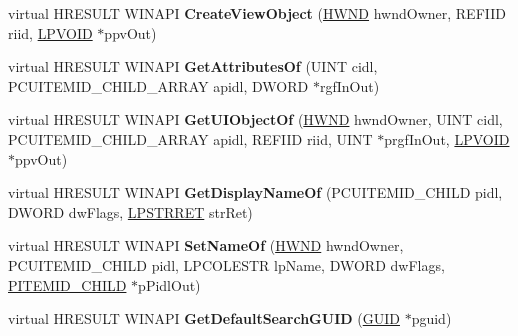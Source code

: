 \begin{DoxyCompactItemize}
virtual H\+R\+E\+S\+U\+LT W\+I\+N\+A\+PI {\bfseries Create\+View\+Object} (\hyperlink{interfacevoid}{H\+W\+ND} hwnd\+Owner, R\+E\+F\+I\+ID riid, \hyperlink{interfacevoid}{L\+P\+V\+O\+ID} $\ast$ppv\+Out)
\item 
\mbox{\label{class_c_control_panel_folder_a7e164af7fec38cb12ba2a0cb64ab7d10}} 
virtual H\+R\+E\+S\+U\+LT W\+I\+N\+A\+PI {\bfseries Get\+Attributes\+Of} (U\+I\+NT cidl, P\+C\+U\+I\+T\+E\+M\+I\+D\+\_\+\+C\+H\+I\+L\+D\+\_\+\+A\+R\+R\+AY apidl, D\+W\+O\+RD $\ast$rgf\+In\+Out)
\item 
\mbox{\label{class_c_control_panel_folder_aff33fd4a0aa911ca1845019c0f487ea9}} 
virtual H\+R\+E\+S\+U\+LT W\+I\+N\+A\+PI {\bfseries Get\+U\+I\+Object\+Of} (\hyperlink{interfacevoid}{H\+W\+ND} hwnd\+Owner, U\+I\+NT cidl, P\+C\+U\+I\+T\+E\+M\+I\+D\+\_\+\+C\+H\+I\+L\+D\+\_\+\+A\+R\+R\+AY apidl, R\+E\+F\+I\+ID riid, U\+I\+NT $\ast$prgf\+In\+Out, \hyperlink{interfacevoid}{L\+P\+V\+O\+ID} $\ast$ppv\+Out)
\item 
\mbox{\label{class_c_control_panel_folder_a279befbb3e06ad2491570c2127312c32}} 
virtual H\+R\+E\+S\+U\+LT W\+I\+N\+A\+PI {\bfseries Get\+Display\+Name\+Of} (P\+C\+U\+I\+T\+E\+M\+I\+D\+\_\+\+C\+H\+I\+LD pidl, D\+W\+O\+RD dw\+Flags, \hyperlink{struct___s_t_r_r_e_t}{L\+P\+S\+T\+R\+R\+ET} str\+Ret)
\item 
\mbox{\label{class_c_control_panel_folder_a2703ab9bff55b924ad55bb70a7467440}} 
virtual H\+R\+E\+S\+U\+LT W\+I\+N\+A\+PI {\bfseries Set\+Name\+Of} (\hyperlink{interfacevoid}{H\+W\+ND} hwnd\+Owner, P\+C\+U\+I\+T\+E\+M\+I\+D\+\_\+\+C\+H\+I\+LD pidl, L\+P\+C\+O\+L\+E\+S\+TR lp\+Name, D\+W\+O\+RD dw\+Flags, \hyperlink{struct___i_t_e_m_i_d___c_h_i_l_d}{P\+I\+T\+E\+M\+I\+D\+\_\+\+C\+H\+I\+LD} $\ast$p\+Pidl\+Out)
\item 
\mbox{\label{class_c_control_panel_folder_a96cd90f1ae7e28c97ef406bc16f71fa2}} 
virtual H\+R\+E\+S\+U\+LT W\+I\+N\+A\+PI {\bfseries Get\+Default\+Search\+G\+U\+ID} (\hyperlink{interface_g_u_i_d}{G\+U\+ID} $\ast$pguid)
\item 
\mbox{\label{class_c_control_panel_folder_a350b64a2419bf2ec59aa22bdd6e7b1c8}} 

\end{DoxyCompactItemize}
